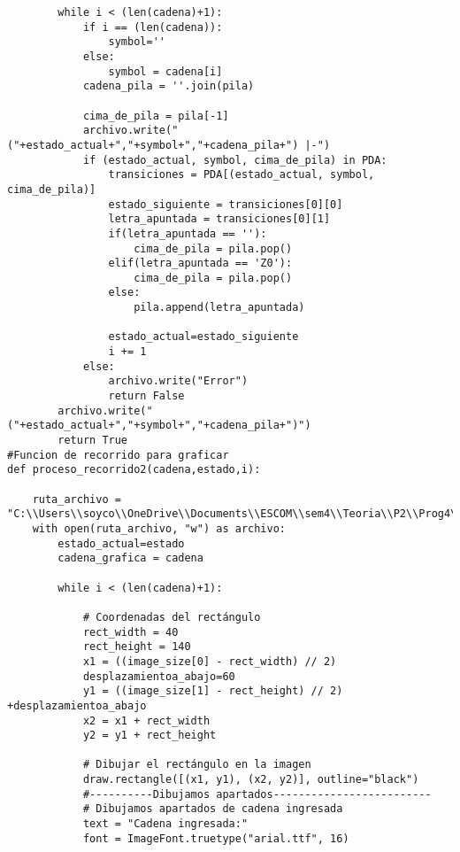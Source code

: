 \begin{enumerate}
\begin{lstlisting}
        while i < (len(cadena)+1):
            if i == (len(cadena)):
                symbol=''
            else:
                symbol = cadena[i]
            cadena_pila = ''.join(pila)

            cima_de_pila = pila[-1]
            archivo.write("("+estado_actual+","+symbol+","+cadena_pila+") |-")
            if (estado_actual, symbol, cima_de_pila) in PDA:
                transiciones = PDA[(estado_actual, symbol, cima_de_pila)]
                estado_siguiente = transiciones[0][0]  
                letra_apuntada = transiciones[0][1]
                if(letra_apuntada == ''):
                    cima_de_pila = pila.pop()
                elif(letra_apuntada == 'Z0'):
                    cima_de_pila = pila.pop()
                else:
                    pila.append(letra_apuntada)
                    
                estado_actual=estado_siguiente
                i += 1
            else:
                archivo.write("Error")
                return False
        archivo.write("("+estado_actual+","+symbol+","+cadena_pila+")")    
        return True    
#Funcion de recorrido para graficar
def proceso_recorrido2(cadena,estado,i):
    
    ruta_archivo = "C:\\Users\\soyco\\OneDrive\\Documents\\ESCOM\\sem4\\Teoria\\P2\\Prog4\\output\\trancisiones.txt"
    with open(ruta_archivo, "w") as archivo:
        estado_actual=estado
        cadena_grafica = cadena
            
        while i < (len(cadena)+1):

            # Coordenadas del rectángulo
            rect_width = 40
            rect_height = 140
            x1 = ((image_size[0] - rect_width) // 2)
            desplazamientoa_abajo=60
            y1 = ((image_size[1] - rect_height) // 2) +desplazamientoa_abajo
            x2 = x1 + rect_width
            y2 = y1 + rect_height
            
            # Dibujar el rectángulo en la imagen
            draw.rectangle([(x1, y1), (x2, y2)], outline="black")
            #----------Dibujamos apartados-------------------------
            # Dibujamos apartados de cadena ingresada
            text = "Cadena ingresada:"
            font = ImageFont.truetype("arial.ttf", 16)


\end{lstlisting}
\end{enumerate}
